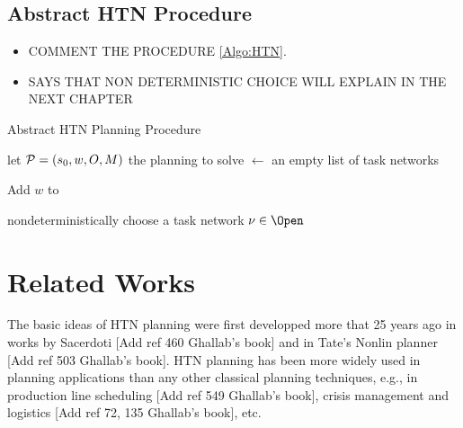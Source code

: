 \subsection{Abstract HTN Procedure}

\begin{itemize}
\item COMMENT THE PROCEDURE \ref{Algo:HTN}.
\item SAYS THAT NON DETERMINISTIC CHOICE WILL EXPLAIN IN THE NEXT CHAPTER
\end{itemize}

\begin{algorithm}[H] 

\caption{Abstract HTN Planning Procedure}
\label{Algo:HTN}



let ${\cal{P}} = (s_0, w, O, M)$ the planning to solve \;
\Open $\leftarrow$ an empty list of task networks \;

Add $w$ to \Open \;

\While{\Open $\ne \emptyset$} {
  nondeterministically choose a task network $\nu \in \Open$ \;
  \Return \Failure \;
}

\end{algorithm}



\section{Related Works}
\label{Sec:Related-works}


The basic ideas of HTN planning were first developped more that 25 years ago in works by Sacerdoti [Add ref 460 Ghallab's book] and in Tate's Nonlin planner [Add ref 503 Ghallab's book]. HTN planning has been more widely used in planning applications than any other classical planning techniques, e.g., in production line scheduling  [Add ref 549 Ghallab's book], crisis management and logistics [Add ref 72, 135 Ghallab's book], etc.

